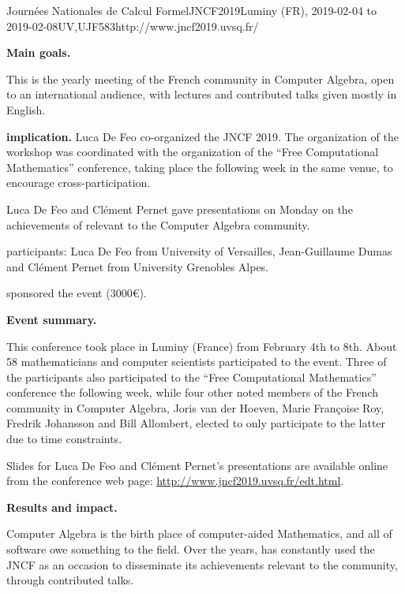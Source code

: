\begin{event}{Journées Nationales de Calcul Formel}{JNCF2019}{Luminy (FR),
  2019-02-04 to
  2019-02-08}{UV,UJF}{58}{3}{http://www.jncf2019.uvsq.fr/}
  
\textbf{Main goals.}

This is the yearly meeting of the French community in Computer
Algebra, open to an international audience, with lectures and
contributed talks given mostly in English.

\textbf{\ODK implication.}
Luca De Feo co-organized the JNCF 2019. The organization of the
workshop was coordinated with the organization of the ``Free
Computational Mathematics'' conference, taking place the following
week in the same venue, to encourage cross-participation.

Luca De Feo and Clément Pernet gave presentations on Monday on the
achievements of \ODK relevant to the Computer Algebra
community.

\ODK participants: Luca De Feo from University of Versailles,
Jean-Guillaume Dumas and Clément Pernet from University Grenobles
Alpes.

\ODK sponsored the event (3000\euro {}).

\textbf{Event summary.}

This conference took place in Luminy (France) from February 4th to
8th. About 58 mathematicians and computer scientists participated to
the event. Three of the participants also participated to the ``Free
Computational Mathematics'' conference the following week, while four
other noted members of the French community in Computer Algebra, Joris
van der Hoeven, Marie Françoise Roy, Fredrik Johansson and Bill
Allombert, elected to only participate to the latter due to time
constraints.

Slides for Luca De Feo and Clément Pernet's presentations are
available online from the conference web page:
\url{http://www.jncf2019.uvsq.fr/edt.html}.

\textbf{Results and impact.}

Computer Algebra is the birth place of computer-aided Mathematics, and
all of \ODK software owe something to the field. Over the years, \ODK
has constantly used the JNCF as an occasion to disseminate its
achievements relevant to the community, through contributed talks.


\end{event}
